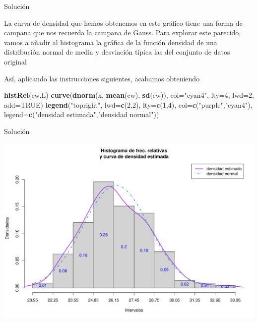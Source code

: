 \documentclass[
  ignorenonframetext,
]{beamer}
\newenvironment{Shaded}{\begin{snugshade}}{\end{snugshade}}
\newcommand{\DataTypeTok}[1]{\textcolor[rgb]{0.13,0.29,0.53}{#1}}
\newcommand{\DecValTok}[1]{\textcolor[rgb]{0.00,0.00,0.81}{#1}}
\newcommand{\KeywordTok}[1]{\textcolor[rgb]{0.13,0.29,0.53}{\textbf{#1}}}
\newcommand{\NormalTok}[1]{#1}
\newcommand{\OtherTok}[1]{\textcolor[rgb]{0.56,0.35,0.01}{#1}}
\newcommand{\StringTok}[1]{\textcolor[rgb]{0.31,0.60,0.02}{#1}}
\begin{document}
\begin{frame}[fragile]{Solución}
\protect\hypertarget{soluciuxf3n-45}{}

La curva de densidad que hemos obtenemos en este gráfico tiene una forma
de campana que nos recuerda la campana de Gauss. Para explorar este
parecido, vamos a añadir al histograma la gráfica de la función densidad
de una distribución normal de media y desviación típica las del conjunto
de datos original

Así, aplicando las instrucciones siguientes, acabamos obteniendo

\begin{Shaded}
\begin{Highlighting}[]
\KeywordTok{histRel}\NormalTok{(cw,L)}
\KeywordTok{curve}\NormalTok{(}\KeywordTok{dnorm}\NormalTok{(x, }\KeywordTok{mean}\NormalTok{(cw), }\KeywordTok{sd}\NormalTok{(cw)), }\DataTypeTok{col=}\StringTok{"cyan4"}\NormalTok{, }\DataTypeTok{lty=}\DecValTok{4}\NormalTok{, }\DataTypeTok{lwd=}\DecValTok{2}\NormalTok{,}
\DataTypeTok{add=}\OtherTok{TRUE}\NormalTok{)}
\KeywordTok{legend}\NormalTok{(}\StringTok{"topright"}\NormalTok{, }\DataTypeTok{lwd=}\KeywordTok{c}\NormalTok{(}\DecValTok{2}\NormalTok{,}\DecValTok{2}\NormalTok{), }\DataTypeTok{lty=}\KeywordTok{c}\NormalTok{(}\DecValTok{1}\NormalTok{,}\DecValTok{4}\NormalTok{), }\DataTypeTok{col=}\KeywordTok{c}\NormalTok{(}\StringTok{"purple"}\NormalTok{,}\StringTok{"cyan4"}\NormalTok{),}
       \DataTypeTok{legend=}\KeywordTok{c}\NormalTok{(}\StringTok{"densidad estimada"}\NormalTok{,}\StringTok{"densidad normal"}\NormalTok{))}
\end{Highlighting}
\end{Shaded}

\end{frame}

\begin{frame}{Solución}
\protect\hypertarget{soluciuxf3n-46}{}

\includegraphics{Tema9.-Agrupacion_datos_cuantitativos_files/figure-beamer/unnamed-chunk-61-1.pdf}

\end{frame}
\end{document}
